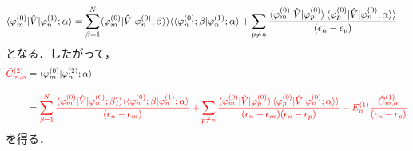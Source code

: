 \begin{align}
    \braket{\varphi^{(0)}_{m}|\hat{V}|\varphi^{(1)}_n;\alpha}
    &=\sum_{\beta=1}^N\langle{\varphi^{(0)}_{m}|\hat{V}|\varphi^{(0)}_n;\beta}\rangle\rangle
    \langle\langle{\varphi^{(0)}_n;\beta|\varphi^{(1)}_n;\alpha}\rangle
    +\sum_{p\neq n}
    \frac{\langle{\varphi^{(0)}_{m}|\hat{V}|\varphi^{(0)}_p}\rangle
    \braket{\varphi^{(0)}_{p}|\hat{V}|\varphi^{(0)}_n;\alpha}\rangle}{(\epsilon_n-\epsilon_p)}
\end{align}
となる．したがって，
\begin{align}
    \textcolor{red}{\Tilde{C}^{(2)}_{m,\alpha}}
    &=\braket{\varphi^{(0)}_{m}|\varphi^{(2)}_n;\alpha}\nn[10pt]
    &=\textcolor{red}{\sum_{\beta=1}^N
    \frac{\langle{\varphi^{(0)}_{m}|\hat{V}|\varphi^{(0)}_n;\beta}\rangle\rangle
    \langle\langle{\varphi^{(0)}_n;\beta|\varphi^{(1)}_n;\alpha}\rangle}{(\epsilon_n-\epsilon_m)}
    +\sum_{p\neq n}
    \frac{\langle{\varphi^{(0)}_{m}|\hat{V}|\varphi^{(0)}_p}\rangle
    \braket{\varphi^{(0)}_{p}|\hat{V}|\varphi^{(0)}_n;\alpha}\rangle}
    {(\epsilon_n-\epsilon_m)(\epsilon_n-\epsilon_p)}
    -E^{(1)}_n\frac{\Tilde{C}^{(1)}_{m,\alpha}}{(\epsilon_n-\epsilon_p)}}
\end{align}
を得る．


